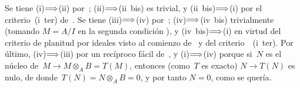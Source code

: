 Se tiene (i)$\Longrightarrow$(ii) por~; (ii)$\Longrightarrow$(ii~bis) es trivial, y
(ii~bis)$\Longrightarrow$(i) por el criterio~(i~ter) de~. Se tiene
(iii)$\Longrightarrow$(iv) por~; (iv)$\Longrightarrow$(iv~bis) trivialmente (tomando
$M=A/I$ en la segunda condición
),
y (iv~bis)$\Longrightarrow$(i) en virtud del criterio de planitud por ideales visto al
comienzo de~ y del criterio~~(i~ter). Por último,
(iv)$\Longrightarrow$(iii) por un recíproco fácil de~, y (i)$\Longrightarrow$(iv) porque
si~$N$ es el núcleo de~$M\to M\otimes_A B=T(M)$, entonces (como~$T$ es
exacto) $N\to T(N)$ es nulo, de donde~$T(N)=N\otimes_A B=0$, y por tanto
$N=0$, como se quería.
